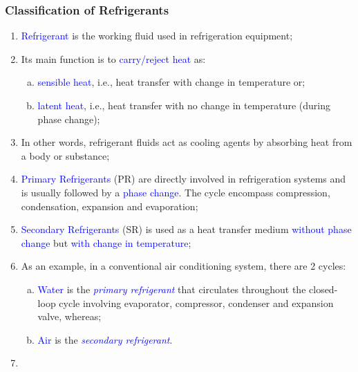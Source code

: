 \documentclass[10pt,compress]{beamer}
\newcommand{\blue}{\textcolor{blue}}
\begin{document}
\begin{frame}
 \frametitle{Classification of Refrigerants}
 \begin{enumerate}[1]\scriptsize
   \item <1-> \textcolor{blue}{Refrigerant} is the working fluid used in refrigeration equipment; 
   \item <2-> Its main function is to \textcolor{blue}{carry/reject heat} as:
     \begin{enumerate}[(a)]\scriptsize
        \item<2-> \blue{sensible heat}, i.e., heat transfer with change in temperature or;
        \item<2-> \blue{latent heat}, i.e., heat transfer with no change in temperature (during phase change);
     \end{enumerate}
   \item <3-> In other words, refrigerant fluids act as cooling agents by absorbing heat from a body or substance;
   \item <4-> \textcolor{blue}{Primary Refrigerants} (PR) are directly involved in refrigeration systems and is usually followed by a \textcolor{blue}{phase change}. The cycle encompass compression, condensation, expansion and evaporation;
   \item <5-> \textcolor{blue}{Secondary Refrigerants} (SR) is used as a heat transfer medium \textcolor{blue}{without phase change} but \textcolor{blue}{with change in temperature};
   \item <6-> As an example, in a conventional air conditioning system, there are 2 cycles: 
    \begin{enumerate}[(a)]\scriptsize
     \item <7-> \textcolor{blue}{Water} is the \textcolor{blue}{{\it primary refrigerant}} that circulates throughout the closed-loop cycle involving evaporator, compressor, condenser and expansion valve, whereas;
     \item <8-> \textcolor{blue}{Air} is the \textcolor{blue}{{\it secondary refrigerant}}.
    \end{enumerate}
    \item <9->  
  \end{enumerate}
\end{frame}
\end{document}
